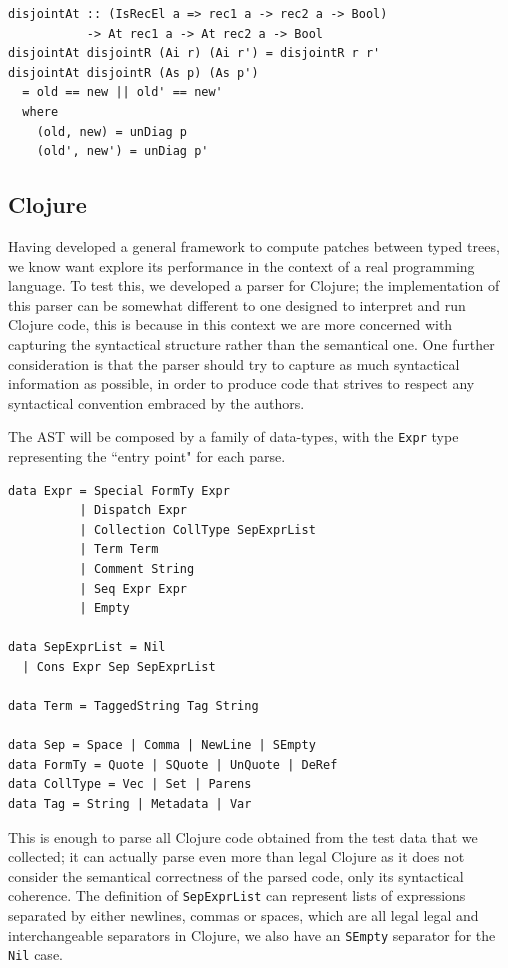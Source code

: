 \documentclass[11pt, titlepage]{article}
\newcommand{\toHaskell}[1]{\texttt{#1}\xspace}
\begin{document}
\begin{verbatim}
disjointAt :: (IsRecEl a => rec1 a -> rec2 a -> Bool)
           -> At rec1 a -> At rec2 a -> Bool
disjointAt disjointR (Ai r) (Ai r') = disjointR r r'
disjointAt disjointR (As p) (As p')
  = old == new || old' == new'
  where
    (old, new) = unDiag p
    (old', new') = unDiag p'
\end{verbatim}

\subsection{Clojure}
Having developed a general framework to compute patches between typed trees, we know want explore its performance in the context of a real programming language.
To test this, we developed a parser for Clojure; the implementation of this parser can be somewhat different to one designed to interpret and run Clojure code, this is because in this context we are more concerned with capturing the syntactical structure rather than the semantical one. One further consideration is that the parser should try to capture as much syntactical information as possible, in order to produce code that strives to respect any syntactical convention embraced by the authors.

The AST will be composed by a family of data-types, with the \toHaskell{Expr} type representing the ``entry point" for each parse. 

\begin{verbatim}
data Expr = Special FormTy Expr
          | Dispatch Expr
          | Collection CollType SepExprList
          | Term Term 
          | Comment String
          | Seq Expr Expr
          | Empty
          
data SepExprList = Nil
  | Cons Expr Sep SepExprList
 
data Term = TaggedString Tag String

data Sep = Space | Comma | NewLine | SEmpty
data FormTy = Quote | SQuote | UnQuote | DeRef
data CollType = Vec | Set | Parens
data Tag = String | Metadata | Var
\end{verbatim}

This is enough to parse all Clojure code obtained from the test data that we collected; it can actually parse even more than legal Clojure as it does not consider the semantical correctness of the parsed code, only its syntactical coherence. The definition of \toHaskell{SepExprList} can represent lists of expressions separated by either newlines, commas or spaces, which are all legal legal and interchangeable separators in Clojure, we also have an \toHaskell{SEmpty} separator for the \toHaskell{Nil} case.
\end{document}
